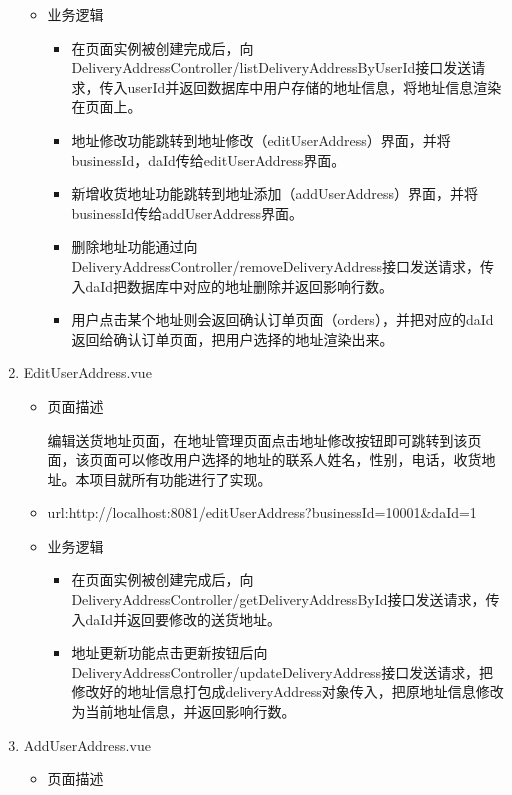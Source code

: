 \begin{enumerate}
\begin{itemize}
    \item 业务逻辑
    \begin{itemize}
      \item 在页面实例被创建完成后，向DeliveryAddressController/listDeliveryAddressByUserId接口发送请求，传入userId并返回数据库中用户存储的地址信息，将地址信息渲染在页面上。
      \item 地址修改功能跳转到地址修改（editUserAddress）界面，并将businessId，daId传给editUserAddress界面。
      \item 新增收货地址功能跳转到地址添加（addUserAddress）界面，并将businessId传给addUserAddress界面。
      \item 删除地址功能通过向DeliveryAddressController/removeDeliveryAddress接口发送请求，传入daId把数据库中对应的地址删除并返回影响行数。
      \item 用户点击某个地址则会返回确认订单页面（orders），并把对应的daId返回给确认订单页面，把用户选择的地址渲染出来。
      \end{itemize}
  \end{itemize}

  \item EditUserAddress.vue
  \begin{itemize}
    \item 页面描述
    
    编辑送货地址页面，在地址管理页面点击地址修改按钮即可跳转到该页面，该页面可以修改用户选择的地址的联系人姓名，性别，电话，收货地址。本项目就所有功能进行了实现。

    \item url:http://localhost:8081/editUserAddress?businessId=10001\&daId=1
    
    \item 业务逻辑
    \begin{itemize}
      \item 在页面实例被创建完成后，向DeliveryAddressController/getDeliveryAddressById接口发送请求，传入daId并返回要修改的送货地址。
      \item 地址更新功能点击更新按钮后向DeliveryAddressController/updateDeliveryAddress接口发送请求，把修改好的地址信息打包成deliveryAddress对象传入，把原地址信息修改为当前地址信息，并返回影响行数。
      \end{itemize}
  \end{itemize}

  \item AddUserAddress.vue
  \begin{itemize}
    \item 页面描述
    

\end{itemize}
\end{enumerate}
